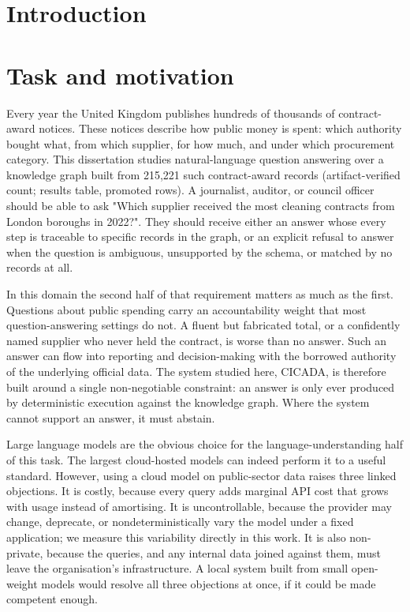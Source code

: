 \section{Introduction}\label{sec:chapter-1-introduction}

\section{Task and motivation}\label{sec:task-and-motivation}

Every year the United Kingdom publishes hundreds of thousands of contract-award notices. These notices describe how public money is spent: which authority bought what, from which supplier, for how much, and under which procurement category. This dissertation studies natural-language question answering over a knowledge graph built from 215,221 such contract-award records (artifact-verified count; results table, promoted rows). A journalist, auditor, or council officer should be able to ask "Which supplier received the most cleaning contracts from London boroughs in 2022?". They should receive either an answer whose every step is traceable to specific records in the graph, or an explicit refusal to answer when the question is ambiguous, unsupported by the schema, or matched by no records at all.

In this domain the second half of that requirement matters as much as the first. Questions about public spending carry an accountability weight that most question-answering settings do not. A fluent but fabricated total, or a confidently named supplier who never held the contract, is worse than no answer. Such an answer can flow into reporting and decision-making with the borrowed authority of the underlying official data. The system studied here, CICADA, is therefore built around a single non-negotiable constraint: an answer is only ever produced by deterministic execution against the knowledge graph. Where the system cannot support an answer, it must abstain.

Large language models are the obvious choice for the language-understanding half of this task. The largest cloud-hosted models can indeed perform it to a useful standard. However, using a cloud model on public-sector data raises three linked objections. It is costly, because every query adds marginal API cost that grows with usage instead of amortising. It is uncontrollable, because the provider may change, deprecate, or nondeterministically vary the model under a fixed application; we measure this variability directly in this work. It is also non-private, because the queries, and any internal data joined against them, must leave the organisation's infrastructure. A local system built from small open-weight models would resolve all three objections at once, if it could be made competent enough.

